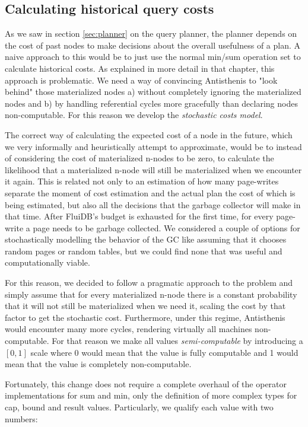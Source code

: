 \subsection{Calculating historical query costs}
\label{sec:historical_cost}

As we saw in section \ref{sec:planner} on the query planner, the planner depends
on the cost of past nodes to make decisions about the overall
usefulness of a plan. A naive approach to this would be to just use
the normal min/sum operation set to calculate historical costs. As
explained in more detail in that chapter, this approach is
problematic. We need a way of convincing Antisthenis to "look behind"
those materialized nodes a) without completely ignoring the
materialized nodes and b) by handling referential cycles more
gracefully than declaring nodes non-computable. For this reason we
develop the \emph{stochastic costs model}.

The correct way of calculating the expected cost of a node in the
future, which we very informally and heuristically attempt to
approximate, would be to instead of considering the cost of
materialized n-nodes to be zero, to calculate the likelihood that a
materialized n-node will still be materialized when we encounter it
again. This is related not only to an estimation of how many
page-writes separate the moment of cost estimation and the actual plan
the cost of which is being estimated, but also all the decisions that
the garbage collector will make in that time. After FluiDB's budget is
exhausted for the first time, for every page-write a page needs
to be garbage collected. We considered a couple of options for
stochastically modelling the behavior of the GC like assuming that it
chooses random pages or random tables, but we could find none that was
useful and computationally viable.

For this reason, we decided to follow a pragmatic approach to the
problem and simply assume that for every materialized n-node there is a
constant probability that it will not still be materialized when we
need it, scaling the cost by that factor to get the stochastic
cost. Furthermore, under this regime, Antisthenis would encounter many
more cycles, rendering virtually all machines non-computable. For that
reason we make all values \emph{semi-computable} by introducing a \([0,1]\)
scale where 0 would mean that the value is fully computable and 1
would mean that the value is completely non-computable.

Fortunately, this change does not require a complete overhaul of the
operator implementations for sum and min, only the definition of more complex types
for cap, bound and result values. Particularly, we qualify each value
with two numbers:

